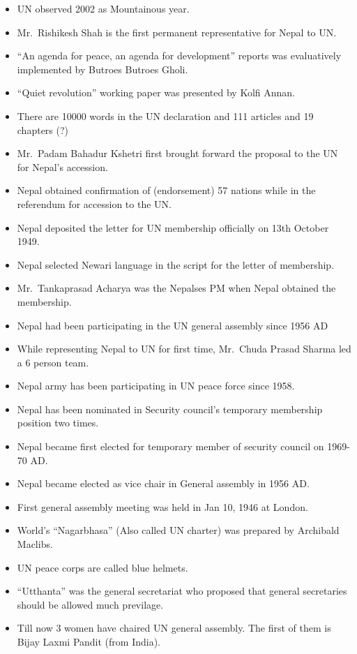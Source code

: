 \documentclass[
]{book}
\begin{document}
\begin{itemize}
\item
  UN observed 2002 as Mountainous year.
\item
  Mr.~Rishikesh Shah is the first permanent representative for Nepal to UN.
\item
  ``An agenda for peace, an agenda for development'' reports was evaluatively implemented by Butroes Butroes Gholi.
\item
  ``Quiet revolution'' working paper was presented by Kolfi Annan.
\item
  There are 10000 words in the UN declaration and 111 articles and 19 chapters (?)
\item
  Mr.~Padam Bahadur Kshetri first brought forward the proposal to the UN for Nepal's accession.
\item
  Nepal obtained confirmation of (endorsement) 57 nations while in the referendum for accession to the UN.
\item
  Nepal deposited the letter for UN membership officially on 13th October 1949.
\item
  Nepal selected Newari language in the script for the letter of membership.
\item
  Mr.~Tankaprasad Acharya was the Nepalses PM when Nepal obtained the membership.
\item
  Nepal had been participating in the UN general assembly since 1956 AD
\item
  While representing Nepal to UN for first time, Mr.~Chuda Prasad Sharma led a 6 person team.
\item
  Nepal army has been participating in UN peace force since 1958.
\item
  Nepal has been nominated in Security council's temporary membership position two times.
\item
  Nepal became first elected for temporary member of security council on 1969-70 AD.
\item
  Nepal became elected as vice chair in General assembly in 1956 AD.
\item
  First general assembly meeting was held in Jan 10, 1946 at London.
\item
  World's ``Nagarbhasa'' (Also called UN charter) was prepared by Archibald Maclibs.
\item
  UN peace corps are called blue helmets.
\item
  ``Utthanta'' was the general secretariat who proposed that general secretaries should be allowed much previlage.
\item
  Till now 3 women have chaired UN general assembly. The first of them is Bijay Laxmi Pandit (from India).

\end{itemize}
\end{document}
